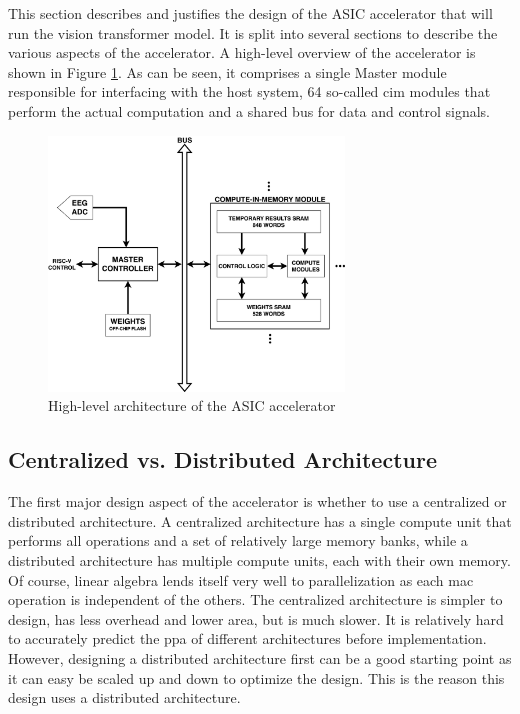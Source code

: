 This section describes and justifies the design of the ASIC accelerator that will run the vision transformer model. It is split into several sections to describe the various aspects
of the accelerator. A high-level overview of the accelerator is shown in Figure \ref{fig:high_level_arch}. As can be seen, it comprises a single Master module responsible for interfacing
with the host system, 64 so-called \ac{cim} modules that perform the actual computation and a shared bus for data and control signals.

\begin{figure}
    \centering
    \includegraphics[width=0.7\textwidth]{assets/high_level_arch.png}
    \caption{High-level architecture of the ASIC accelerator}
    \label{fig:high_level_arch}
\end{figure}

\subsection{Centralized vs. Distributed Architecture}
The first major design aspect of the accelerator is whether to use a centralized or distributed architecture. A centralized architecture has a single compute unit that performs all
operations and a set of relatively large memory banks, while a distributed architecture has multiple compute units, each with their own memory. Of course, linear algebra lends itself
very well to parallelization as each \ac{mac} operation is independent of the others. The centralized architecture is simpler to design, has less overhead and lower area, but is much
slower. It is relatively hard to accurately predict the \ac{ppa} of different architectures before implementation. However, designing a distributed architecture first can be a good
starting point as it can easy be scaled up and down to optimize the design. This is the reason this design uses a distributed architecture.

